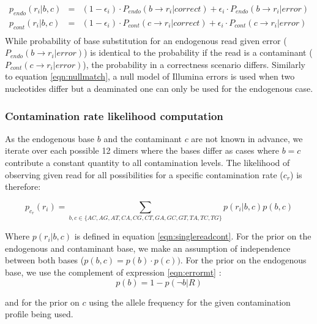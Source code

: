 \documentclass[a4paper,12pt]{article}
\begin{document}
{\small
\begin{eqnarray}
  p_{endo}(r_i|b,c)   & = &  (1-\epsilon_i ) \cdot  P_{endo}( b \to r_i|correct) +  \epsilon_i \cdot P_{endo}(  b \to r_i |error)   \\
  p_{cont}(r_i|b,c)   & = &  (1-\epsilon_i ) \cdot  P_{cont}( c \to r_i|correct) +  \epsilon_i \cdot P_{cont}(  c \to r_i |error)   \\
\end{eqnarray} 
}
\noindent While probability of base substitution for an endogenous read given error ($P_{endo}(  b \to r_i |error)$) is identical to the probability if the read is a contaminant ($P_{cont}(  c \to r_i |error)$), the probability in a correctness scenario differs. Similarly to equation \ref{eqn:nullmatch}, a null model of Illumina errors is used when two nucleotides differ but a deaminated one can only be used for the endogenous case. 

\subsubsection{Contamination rate likelihood computation}

As the endogenous base $b$ and the contaminant $c$ are not known in advance, we iterate over each possible 12 dimers where the bases differ as cases where $b=c$ contribute a constant quantity to all contamination levels. The likelihood of observing given read for all possibilities for a specific contamination rate ($c_r$) is therefore:

\begin{equation}
p_{c_r}(r_i) = \sum\limits_{ b,c \in \{AC,AG,AT,CA,CG,CT,GA,GC,GT,TA,TC,TG\} } p(r_i|b,c) p(b,c)
\end{equation}

\noindent Where $p(r_i|b,c)$ is defined in equation \ref{eqn:singlereadcont}. For the prior on the endogenous and contaminant base, we make an assumption of independence between both bases ($p(b,c) = p(b) \cdot p(c))$. For the prior on the endogenous base, we use the complement of expression \ref{eqn:errormt} :
\begin{equation}
p(b)  = 1 - p(\neg b|R)
\end{equation}

\noindent  and for the prior on $c$ using the allele frequency for the given contamination profile being used. 
\end{document}

